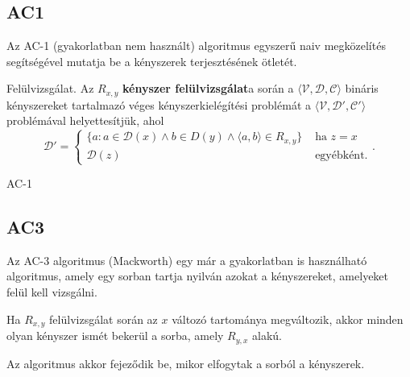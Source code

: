 \subsection{AC1}

Az AC-1 (gyakorlatban nem használt) algoritmus egyszerű naiv megközelítés
segítségével mutatja be a kényszerek terjesztésének ötletét.

\begin{definicio}
    Felülvizsgálat.
    Az $R_{x,y}$ \textbf{kényszer felülvizsgálat}a során a
    $\langle \mathcal{V}, \mathcal{D}, \mathcal{C} \rangle$
    bináris kényszereket tartalmazó véges kényszerkielégítési problémát a
    $\langle \mathcal{V}, \mathcal{D}', \mathcal{C}' \rangle$
    problémával helyettesítjük, ahol \[
    \mathcal{D}' =
    \begin{cases}
        \{a : a \in \mathcal{D}(x) \land b \in D(y) \land \langle a, b\rangle \in R_{x,y}\}
        &\text{ ha } z=x \\
        \mathcal{D}(z)
        &\text{ egyébként.}
    \end{cases}
    .\]
\end{definicio}

\begin{algorithm}[H]
    {
        \;
    }
    \caption{AC-1}
\end{algorithm}

\subsection{AC3}

Az AC-3 algoritmus (Mackworth) egy már a gyakorlatban is használható
algoritmus, amely egy sorban tartja nyilván azokat a kényszereket, amelyeket
felül kell vizsgálni.

Ha $R_{x,y}$ felülvizsgálat során az  $x$ változó tartománya megváltozik, akkor
minden olyan kényszer ismét bekerül a sorba, amely $R_{y,x}$ alakú.

Az algoritmus akkor fejeződik be, mikor elfogytak a sorból a kényszerek.

